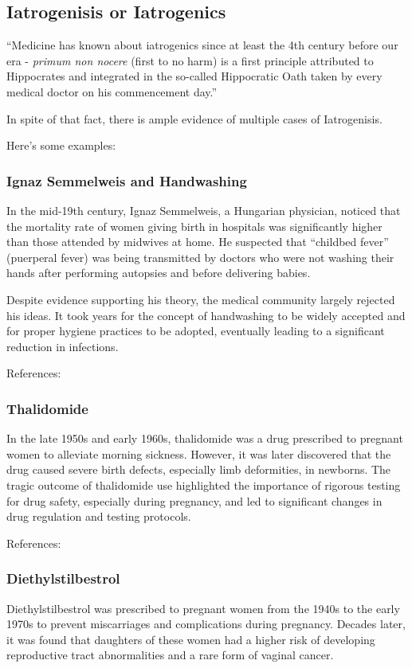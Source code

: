 \documentclass{article}
\begin{document}
\subsection{Iatrogenisis or Iatrogenics}

``Medicine has known about iatrogenics since at least the 4th century before our era - \emph{primum non nocere} (first to no harm) is a first principle attributed to Hippocrates and integrated in the so-called Hippocratic Oath taken by every medical doctor on his commencement day.''\cite{Taleb2012}

In spite of that fact, there is ample evidence of multiple cases of Iatrogenisis. \cite{VarleyVarma2021}

Here's some examples:

\subsubsection{Ignaz Semmelweis and Handwashing}

In the mid-19th century, Ignaz Semmelweis, a Hungarian physician, noticed that the mortality rate of women giving birth in hospitals was significantly higher than those attended by midwives at home. He suspected that  ``childbed fever'' (puerperal fever) was being transmitted by doctors who were not washing their hands after performing autopsies and before delivering babies.

Despite evidence supporting his theory, the medical community largely rejected his ideas. It took years for the concept of handwashing to be widely accepted and for proper hygiene practices to be adopted, eventually leading to a significant reduction in infections.

References: \cite{Semmelweis2006}

\subsubsection{Thalidomide}
In the late 1950s and early 1960s, thalidomide was a drug prescribed to pregnant women to alleviate morning sickness. However, it was later discovered that the drug caused severe birth defects, especially
limb deformities, in newborns. The tragic outcome of thalidomide use highlighted the importance of rigorous testing for drug safety, especially during pregnancy, and led to significant changes in drug
regulation and testing protocols.

References: \cite{WGMcbride}

\subsubsection{Diethylstilbestrol}
Diethylstilbestrol was prescribed to pregnant women from the 1940s to the early 1970s to prevent miscarriages and complications during pregnancy. Decades later, it was found that daughters of these women
had a higher risk of developing reproductive tract abnormalities and a rare form of vaginal cancer.
\end{document}
